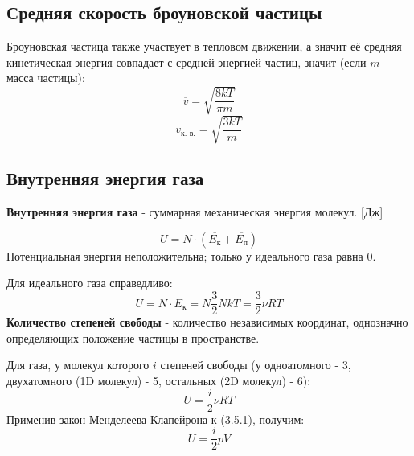 \subsection{Средняя скорость броуновской частицы}
Броуновская частица также участвует в тепловом движении, а значит её средняя кинетическая энергия совпадает с средней энергией частиц, значит (если $m$ - масса частицы):
\[\overline{v}=\sqrt{\frac{8kT}{\pi m}}\]
\[v_{\text{к. в.}}=\sqrt{\frac{3kT}{m}}\]



\subsection{Внутренняя энергия газа}
\textbf{Внутренняя энергия газа} - суммарная механическая энергия молекул. [Дж]\par
\[U=N \cdot (\overline{E_\text{к}}+\overline{E_\text{п}})\]
Потенциальная энергия неположительна; только у идеального газа равна 0.\par

Для идеального газа справедливо:
\[U=N\cdot E_{\text{к}}=N\frac{3}{2}NkT=\frac{3}{2} \nu RT\]
\textbf{Количество степеней свободы} - количество независимых координат, однозначно определяющих положение частицы в пространстве.\par
Для газа, у молекул которого $i$ степеней свободы (у одноатомного - 3, двухатомного (1D молекул) - 5, остальных (2D молекул) - 6):
\begin{equation}
U=\frac{i}{2}\nu RT
\end{equation}
Применив закон Менделеева-Клапейрона к (3.5.1), получим:
\begin{equation*}
U=\frac{i}{2}pV
\end{equation*}
